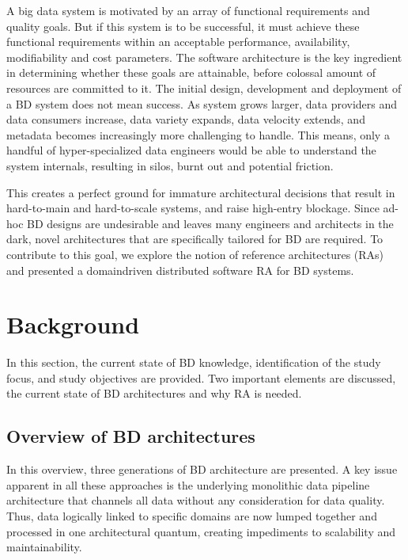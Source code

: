 \documentclass[conference]{IEEEtran}
\begin{document}
A big data system is motivated by an array of functional
requirements and quality goals. But if this system is to be successful, it must achieve these functional requirements within
an acceptable performance, availability, modifiability and cost
parameters. The software architecture is the key ingredient
in determining whether these goals are attainable, before
colossal amount of resources are committed to it. The initial
design, development and deployment of a BD system does
not mean success. As system grows larger, data providers and
data consumers increase, data variety expands, data velocity
extends, and metadata becomes increasingly more challenging
to handle. This means, only a handful of hyper-specialized data
engineers would be able to understand the system internals,
resulting in silos, burnt out and potential friction.

This creates a perfect ground for immature architectural
decisions that result in hard-to-main and hard-to-scale systems,
and raise high-entry blockage. Since ad-hoc BD designs are
undesirable and leaves many engineers and architects in the
dark, novel architectures that are specifically tailored for BD
are required. To contribute to this goal, we explore the notion
of reference architectures (RAs) and presented a domaindriven distributed software RA for BD systems.


\section{Background}
In this section, the current state of BD knowledge, identification of the study focus, and study objectives are provided. Two important elements are discussed, the current state of BD architectures and why RA is needed.

\subsection{Overview of BD architectures}
In this overview, three generations of BD architecture are presented. A key issue apparent in all these approaches is the underlying monolithic data pipeline architecture that channels all data without any consideration for data quality. Thus, data logically linked to specific domains are now lumped together and processed in one architectural quantum, creating impediments to scalability and maintainability.
\end{document}
